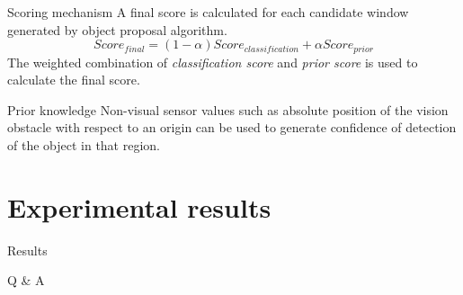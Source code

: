 \documentclass[14pt]{beamer}
\begin{document}
\begin{frame}{Scoring mechanism}
  A final score is calculated for each candidate window generated by object
  proposal algorithm.
  \[
    Score_{final} = (1 - \alpha) Score_{classification} + \alpha Score_{prior}
  \]
  The weighted combination of \textit{classification score} and \textit{prior
    score} is used to calculate the final score.
\end{frame}

\begin{frame}{Prior knowledge}
  Non-visual sensor values such as absolute position of the vision obstacle with respect to
  an origin can be used to generate confidence of detection of the object in
  that region.
\end{frame}

\section{Experimental results}

\begin{frame}{Results}

\begin{table}[H]
\end{table}

\end{frame}

\begin{frame}[standout]{}
  Q \& A
\end{frame}
\end{document}
